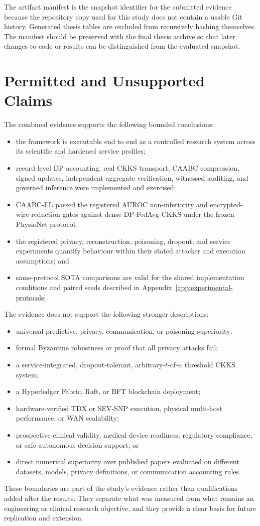 The artifact manifest is the snapshot identifier for the submitted evidence because the repository copy used for this study does not contain a usable Git history. Generated thesis tables are excluded from recursively hashing themselves. The manifest should be preserved with the final thesis archive so that later changes to code or results can be distinguished from the evaluated snapshot.

\section{Permitted and Unsupported Claims}
\label{appsec:claim-boundaries}

The combined evidence supports the following bounded conclusions:

\begin{itemize}
    \item the framework is executable end to end as a controlled research system across its scientific and hardened service profiles;
    \item record-level DP accounting, real CKKS transport, CAABC compression, signed updates, independent aggregate verification, witnessed auditing, and governed inference were implemented and exercised;
    \item CAABC-FL passed the registered AUROC non-inferiority and encrypted-wire-reduction gates against dense DP-FedAvg-CKKS under the frozen PhysioNet protocol;
    \item the registered privacy, reconstruction, poisoning, dropout, and service experiments quantify behaviour within their stated attacker and execution assumptions; and
    \item same-protocol SOTA comparisons are valid for the shared implementation conditions and paired seeds described in Appendix~\ref{app:experimental-protocols}.
\end{itemize}

The evidence does not support the following stronger descriptions:

\begin{itemize}
    \item universal predictive, privacy, communication, or poisoning superiority;
    \item formal Byzantine robustness or proof that all privacy attacks fail;
    \item a service-integrated, dropout-tolerant, arbitrary-$t$-of-$n$ threshold CKKS system;
    \item a Hyperledger Fabric, Raft, or BFT blockchain deployment;
    \item hardware-verified TDX or SEV-SNP execution, physical multi-host performance, or WAN scalability;
    \item prospective clinical validity, medical-device readiness, regulatory compliance, or safe autonomous decision support; or
    \item direct numerical superiority over published papers evaluated on different datasets, models, privacy definitions, or communication accounting rules.
\end{itemize}

These boundaries are part of the study's evidence rather than qualifications added after the results. They separate what was measured from what remains an engineering or clinical research objective, and they provide a clear basis for future replication and extension.
